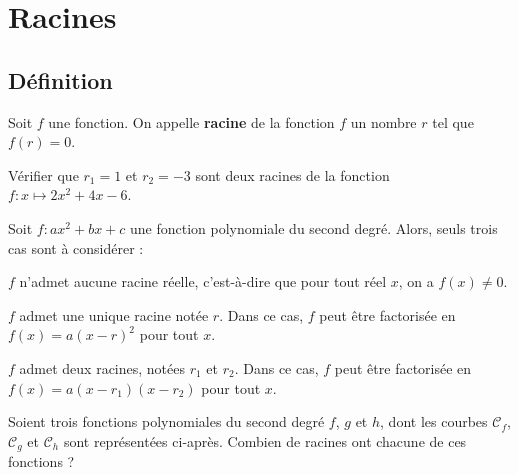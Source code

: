 \documentclass{article}
\begin{document}
\newpage

\section{Racines}

\subsection{Définition}

\begin{tcolorbox}
\begin{definition}
Soit $f$ une fonction. On appelle \textbf{racine} de la fonction $f$ un nombre $r$ tel que $f(r) = 0$.
\end{definition}
\end{tcolorbox}
\begin{example}
Vérifier que $r_1 = 1$ et $r_2 = - 3$ sont deux racines de la fonction $f : x \mapsto 2x^2 + 4x - 6$.
\vspace*{0.2cm}

\emptybox{3cm}
\end{example}
\begin{proposition}
Soit $f : ax^2 + bx + c$ une fonction polynomiale du second degré. Alors, seuls trois cas sont à considérer :
\begin{enumquestions}
\item $f$ n'admet aucune racine réelle, c'est-à-dire que pour tout réel $x$, on a $f(x) \neq 0$.
\item $f$ admet une unique racine notée $r$. Dans ce cas, $f$ peut être factorisée en $f(x) = a (x - r)^2$ pour tout $x$.
\item $f$ admet deux racines, notées $r_1$ et $r_2$. Dans ce cas, $f$ peut être factorisée en $f(x) = a(x - r_1)(x - r_2)$ pour tout $x$.    
\end{enumquestions} 
\end{proposition}
\begin{example}
Soient trois fonctions polynomiales du second degré $f$, $g$ et $h$, dont les courbes $\mathcal{C}_f$, $\mathcal{C}_g$ et $\mathcal{C}_h$ sont représentées ci-après. Combien de racines ont chacune de ces fonctions ?
\begin{center}
\end{center}
\end{example}
\newpage
\end{document}
